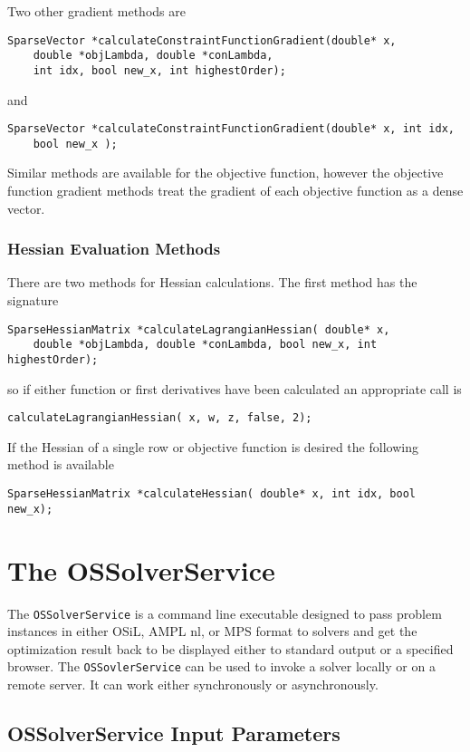 \documentclass[11pt]{article}
\renewcommand{\_}{{\char"5F}}
\renewcommand{\{}{{\char"7B}}
\renewcommand{\}}{{\char"7D}}
\renewcommand{\^}{{\char"0D}}
\renewcommand{\'}{{\char"0D}}
\begin{document}
Two other gradient methods are
\begin{verbatim}
SparseVector *calculateConstraintFunctionGradient(double* x, 
    double *objLambda, double *conLambda,
    int idx, bool new_x, int highestOrder);
\end{verbatim}
and
\begin{verbatim}
SparseVector *calculateConstraintFunctionGradient(double* x, int idx, 
    bool new_x );
\end{verbatim}

Similar methods are available for the objective function, however the objective function gradient methods treat the gradient of each objective function as a dense vector. 


\subsubsection{Hessian Evaluation Methods}

There are two methods for Hessian calculations.  The first method has the signature
\begin{verbatim}
SparseHessianMatrix *calculateLagrangianHessian( double* x, 
    double *objLambda, double *conLambda, bool new_x, int highestOrder);
\end{verbatim}
so if either function or first derivatives have been calculated an appropriate call is
\begin{verbatim}
calculateLagrangianHessian( x, w, z, false, 2);
\end{verbatim}
If the Hessian of a single row or objective function is desired the following method is available
\begin{verbatim}
SparseHessianMatrix *calculateHessian( double* x, int idx, bool new_x);
\end{verbatim}

\section{The OSSolverService}\label{section:ossolverservice}

The {\tt OSSolverService} is a command line executable designed to pass problem instances in either  OSiL, AMPL nl, or MPS format  to solvers and get the optimization result back to be displayed either to standard output or a specified browser.  The {\tt OSSovlerService} can be used to invoke a solver locally or on a remote server. It can work either synchronously or asynchronously. 

\subsection{OSSolverService Input Parameters}
\end{document}

